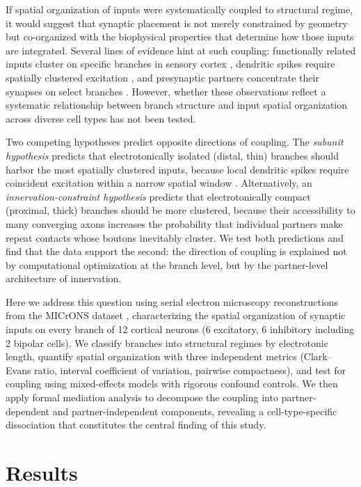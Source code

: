 \documentclass[11pt]{article}
\begin{document}
If spatial organization of inputs were systematically coupled to structural regime, it would suggest that synaptic placement is not merely constrained by geometry but co-organized with the biophysical properties that determine how those inputs are integrated. Several lines of evidence hint at such coupling: functionally related inputs cluster on specific branches in sensory cortex \citep{jia2010, druckmann2014}, dendritic spikes require spatially clustered excitation \citep{larkum2009, branco2010}, and presynaptic partners concentrate their synapses on select branches \citep{kasthuri2015}. However, whether these observations reflect a systematic relationship between branch structure and input spatial organization across diverse cell types has not been tested.

Two competing hypotheses predict opposite directions of coupling. The \textit{subunit hypothesis} predicts that electrotonically isolated (distal, thin) branches should harbor the most spatially clustered inputs, because local dendritic spikes require coincident excitation within a narrow spatial window \citep{polsky2004, larkum2009}. Alternatively, an \textit{innervation-constraint hypothesis} predicts that electrotonically compact (proximal, thick) branches should be more clustered, because their accessibility to many converging axons increases the probability that individual partners make repeat contacts whose boutons inevitably cluster. We test both predictions and find that the data support the second: the direction of coupling is explained not by computational optimization at the branch level, but by the partner-level architecture of innervation.

Here we address this question using serial electron microscopy reconstructions from the MICrONS dataset \citep{microns2021}, characterizing the spatial organization of synaptic inputs on every branch of 12 cortical neurons (6 excitatory, 6 inhibitory including 2 bipolar cells). We classify branches into structural regimes by electrotonic length, quantify spatial organization with three independent metrics (Clark--Evans ratio, interval coefficient of variation, pairwise compactness), and test for coupling using mixed-effects models with rigorous confound controls. We then apply formal mediation analysis to decompose the coupling into partner-dependent and partner-independent components, revealing a cell-type-specific dissociation that constitutes the central finding of this study.

\section{Results}
\end{document}
